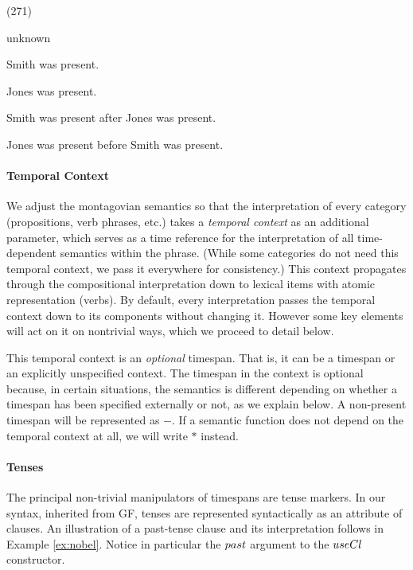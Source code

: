 \documentclass[11pt,a4paper]{article}
\newcommand\hyp{\item[H]}
\newcommand\answer{\item[A]}
\newcommand\fracasex[2]{\begin{lingex}\item[(#1)] \begin{subex} #2 \end{subex} \end{lingex} }
\begin{document}
\fracasex{271}{\answer unknown
\item	Smith was present.
\item	Jones was present.
\item	Smith was present after Jones was present.
\hyp 	Jones was present before Smith was present.
}

\paragraph{Temporal Context}

We adjust the montagovian semantics so that the interpretation of
every category (propositions, verb phrases, etc.) takes a
\emph{temporal context} as an additional parameter, which serves as a time
reference for the interpretation of all time-dependent semantics
within the phrase. (While some categories do not need this temporal context, we pass it everywhere for consistency.)  This context propagates through the compositional
interpretation down to lexical items with atomic representation
(verbs). By default, every interpretation passes the temporal context
down to its components without changing it. However some key elements
will act on it on nontrivial ways, which we proceed to detail below.

This temporal context is an \emph{optional} timespan. That is, it can
be a timespan or an explicitly unspecified context.
\newcommand\nospan{\ensuremath{-}}
\newcommand\anyspan{\ensuremath{\mathbf{*}}} The timespan in the context is
optional because, in certain situations, the semantics is different
depending on whether a timespan has been specified externally or not,
as we explain below. A non-present timespan will be represented as
\nospan{}. If a semantic function does not depend on the temporal
context at all, we will write \anyspan{} instead.

\paragraph{Tenses}

\newcommand\varid[1]{\mathnormal{#1}}
%
The principal non-trivial manipulators of timespans are tense
markers. In our syntax, inherited from GF, tenses are represented
syntactically as an attribute of clauses. An illustration of a
past-tense clause and its interpretation follows in
Example \ref{ex:nobel}. Notice in particular the $\varid{past}$ argument to
the $\varid{useCl}$ constructor.
\end{document}
